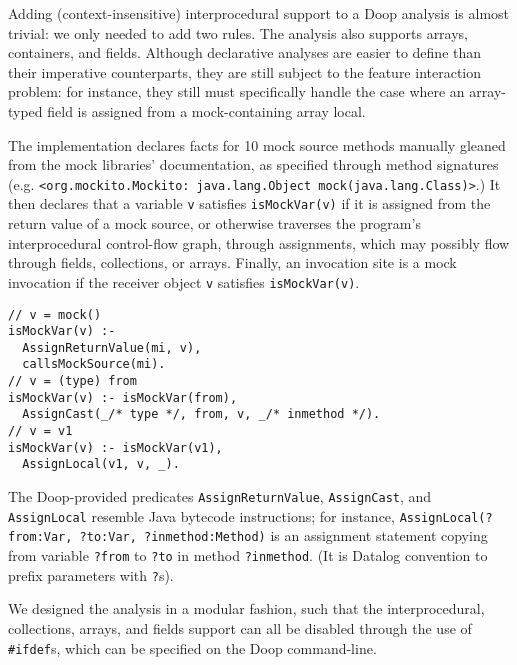 Adding (context-insensitive) interprocedural support to a Doop analysis is almost trivial: we only needed to add two rules.
The analysis also supports arrays, containers, and fields. Although declarative analyses are easier to define than their imperative counterparts, they are still subject to the feature interaction problem: for instance, they still must specifically handle the case where an array-typed field is assigned from a mock-containing array local.

The implementation declares facts for 10 mock source methods manually gleaned from the mock libraries' documentation, as specified through method signatures (e.g. 
\texttt{<org.mockito.Mockito: java.lang.Object mock(java.lang.Class)>}.)
It then declares that a variable {\tt v} satisfies \verb+isMockVar(v)+ if it is assigned from the return value of a mock source, or otherwise traverses the program's interprocedural control-flow graph, through assignments, which may possibly flow through fields, collections, or arrays. Finally, an invocation site is a mock invocation if the receiver object {\tt v} satisfies \verb+isMockVar(v)+.

\begin{lstlisting}[basicstyle=\ttfamily\small,numbers=none,label={lst:core},caption={Selected rules for Datalog mock analysis},
basicstyle=\scriptsize\ttfamily, framesep=4.5mm, framexleftmargin=1.0mm, captionpos=b, label=lis:datalog-rule, escapechar=!]
// v = mock()
isMockVar(v) :-
  AssignReturnValue(mi, v),
  callsMockSource(mi).
// v = (type) from
isMockVar(v) :- isMockVar(from),
  AssignCast(_/* type */, from, v, _/* inmethod */).
// v = v1
isMockVar(v) :- isMockVar(v1),
  AssignLocal(v1, v, _).
\end{lstlisting}

The Doop-provided predicates \texttt{AssignReturnValue}, \texttt{AssignCast}, and \texttt{AssignLocal} resemble Java bytecode instructions; for instance, \texttt{AssignLocal(?from:Var, ?to:Var, ?inmethod:Method)} is an assignment statement copying from variable \texttt{?from} to \texttt{?to} in method \texttt{?inmethod}. (It is Datalog convention to prefix parameters with \texttt{?}s).

We designed the analysis in a modular fashion, such that the interprocedural, collections, arrays, and fields support can all be disabled through the use of \verb+#ifdef+s, which can be specified on the Doop command-line.

